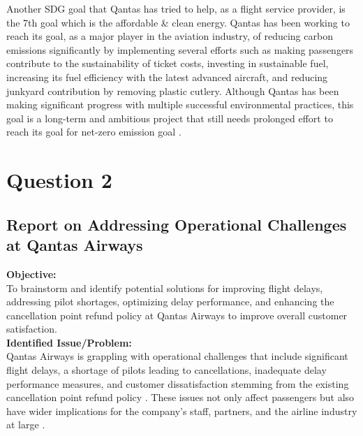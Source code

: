 \documentclass[12pt,a4paper]{article}
\begin{document}
\noindent Another SDG goal that Qantas has tried to help, as a flight service provider, is the 7th goal which is the affordable \& clean energy. Qantas has been working to reach its goal, as a major player in the aviation industry, of reducing carbon emissions significantly by implementing several efforts such as making passengers contribute to the sustainability of ticket costs, investing in sustainable fuel, increasing its fuel efficiency with the latest advanced aircraft, and reducing junkyard contribution by removing plastic cutlery. Although Qantas has been making significant progress with multiple successful environmental practices, this goal is a long-term and ambitious project that still needs prolonged effort to reach its goal for net-zero emission goal \citep{Ref1.6}. \\ 
\pagebreak%

\setcounter{page}{3}

\section{Question 2}
\subsection{Report on Addressing Operational Challenges at Qantas Airways }
\label{sec:Question 2}
\textbf{Objective:}\\
\noindent To brainstorm and identify potential solutions for improving flight delays, addressing pilot shortages, optimizing delay performance, and enhancing the cancellation point refund policy at Qantas Airways to improve overall customer satisfaction.\\

\noindent\textbf{Identified Issue/Problem:}\\
\noindent Qantas Airways is grappling with operational challenges that include significant flight delays, a shortage of pilots leading to cancellations, inadequate delay performance measures, and customer dissatisfaction stemming from the existing cancellation point refund policy \citep{Ref2.1}. These issues not only affect passengers but also have wider implications for the company’s staff, partners, and the airline industry at large \citep{Ref2.2}. \\
\end{document}
